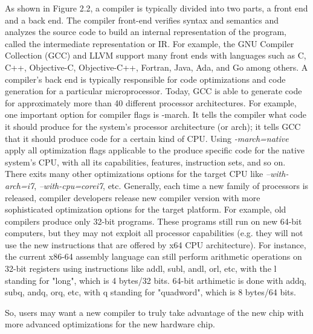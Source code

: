 As shown in Figure 2.2, a compiler is typically divided into two parts, a front end and a back end. The compiler front-end verifies syntax and semantics and analyzes the source code to build an internal representation of the program, called the intermediate representation or IR. For example, the GNU Compiler Collection (GCC) and LLVM support many front ends with languages such as C, C++, Objective-C, Objective-C++, Fortran, Java, Ada, and Go among others. 
A compiler’s back end is typically responsible for code optimizations and code generation for a particular microprocessor. Today, GCC is able to generate code for approximately more than 40 different processor architectures.
For example, one important option for compiler flags is -march. It tells the compiler what code it should produce for the system's processor architecture (or arch); it tells GCC that it should produce code for a certain kind of CPU. Using \textit{-march=native} apply all optimization flags applicable to the produce specific code for the native system's CPU, with all its capabilities, features, instruction sets, and so on. There exits many other optimizations options for the target CPU like \textit{--with-arch=i7}, \textit{--with-cpu=corei7}, etc.
Generally, each time a new family of processors is released, compiler developers release new compiler version with more sophisticated optimization options for the target platform. For example, old compilers produce only 32-bit programs. These programs still run on new 64-bit computers, but they may not exploit all processor capabilities (e.g. they will not use the new instructions that are offered by x64 CPU architecture). For instance, the current x86-64 assembly language can still perform arithmetic operations on 32-bit registers using instructions like addl, subl, andl, orl, etc, with the l standing for "long", which is 4 bytes/32 bits. 64-bit arthimetic is done with addq, subq, andq, orq, etc, with q standing for "quadword", which is 8 bytes/64 bits.

So, users may want a new compiler to truly take advantage of the new chip with more advanced optimizations for the new hardware chip.








